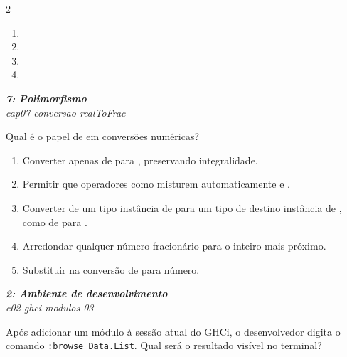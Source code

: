 \documentclass[a4paper,10pt,brazil]{article}
\begin{document}
\begin{multicols}{2}
\begin{enumerate}
  \item {}

  \item {}

  \item {}

  \item {}


\end{enumerate}

\begin{flushright}
  \footnotesize
  \textit{\textbf{7: Polimorfismo}}\\
  \textit{cap07-conversao-realToFrac}\\

\end{flushright}
Qual é o papel de  em conversões numéricas?
\begin{enumerate}
  \item Converter apenas de  para , preservando integralidade.
  \item Permitir que operadores como \haskellinline{(+)} misturem automaticamente  e .
  \item Converter de um tipo instância de  para um tipo de destino instância de , como de  para .
  \item Arredondar qualquer número fracionário para o inteiro mais próximo.
  \item Substituir  na conversão de  para número.

\end{enumerate}

\begin{flushright}
  \footnotesize
  \textit{\textbf{2: Ambiente de desenvolvimento}}\\
  \textit{c02-ghci-modulos-03}\\

\end{flushright}
Após adicionar um módulo à sessão atual do GHCi, o desenvolvedor digita o comando \texttt{:browse Data.List}. Qual será o resultado visível no terminal?


\end{multicols}
\end{document}
